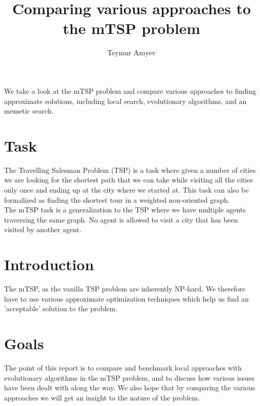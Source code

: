 \documentclass[journal]{IEEEtrancz}
\begin{document}
\title{Comparing various approaches to the mTSP problem}
\author{Teymur Azayev}

\maketitle

\begin{abstrakt}
We take a look at the mTSP problem and compare various approaches to finding approximate solutions, including local search, evolutionary algorithms, and an memetic search.
\end{abstrakt}


\IEEEpeerreviewmaketitle

\section{Task}
The Travelling Salesman Problem (TSP) is a task where given a number of cities we are looking for the shortest path that we can take while visiting all the cities only once and ending up at the city where we started at. 
This task can also be formalized as finding the shortest tour in a weighted non-oriented graph. \\
The mTSP task is a generalization to the TSP where we have multiple agents traversing the same graph. No agent is allowed to visit a city that has been visited by another agent.

\section{Introduction}
The mTSP, as the vanilla TSP problem are inherently NP-hard. We therefore have to use various approximate
optimization techniques which help us find an 'acceptable' solution to the problem.

\section{Goals}
The point of this report is to compare and benchmark local approaches with evolutionary algorithms in the mTSP
problem, and to discuss how various issues have been dealt with along the way. We also hope that by comparing the various approaches we will get an insight to the nature of the problem.
\end{document}
